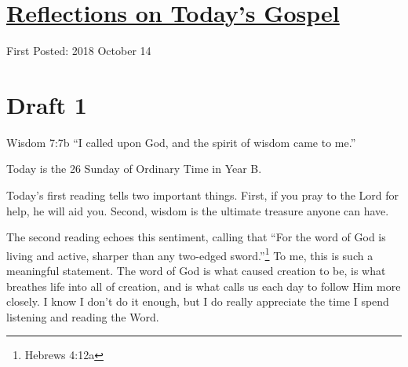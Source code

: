 \documentclass[12pt]{article}[titlepage]
\newcommand{\say}[1]{``#1''}
\newcommand{\1}{\={a}}
\newcommand{\2}{\={e}}
\newcommand{\3}{\={\i}}
\newcommand{\4}{\=o}
\newcommand{\5}{\=u}
\newcommand{\6}{\={A}}
\renewcommand{\,}{\textsuperscript{,}}
\begin{document}
\doublespacing
\section{\href{reflections-on-readings-28-ordinary-b.html}{Reflections on Today's Gospel}}
First Posted: 2018 October 14
\section{Draft 1}	
Wisdom 7:7b \say{I called upon God, and the spirit of wisdom came to me.}

Today is the 26 Sunday of Ordinary Time in Year B.

Today's first reading tells two important things.
First, if you pray to the Lord for help, he will aid you.
Second, wisdom is the ultimate treasure anyone can have.

The second reading echoes this sentiment, calling that \say{For the word of God is living and active, sharper than any two-edged sword.}\footnote{Hebrews 4:12a}
To me, this is such a meaningful statement.
The word of God is what caused creation to be, is what breathes life into all of creation, and is what calls us each day to follow Him more closely.
I know I don't do it enough, but I do really appreciate the time I spend listening and reading the Word.
\end{document}
